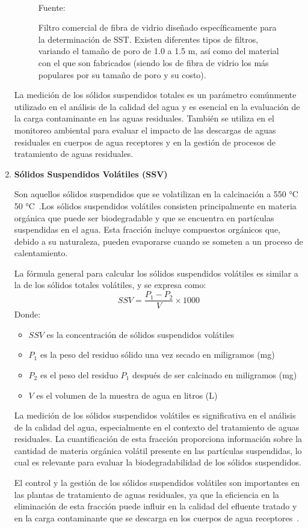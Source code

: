 \begin{enumerate}[label=\textbf{$\bullet$}]
\begin{figure}[H]
		\\\small{Fuente: \cite{Lobov}}
		\caption{Filtro comercial de fibra de vidrio diseñado específicamente para la determinación de SST. Existen diferentes tipos de filtros, variando el tamaño de poro de 1.0 a 1.5 m, así como del material con el que son fabricados (siendo los de fibra de vidrio los más populares por su tamaño de poro y su costo).}\label{fig:filtro}
	\end{figure}
	La medición de los sólidos suspendidos totales es un parámetro comúnmente utilizado en el análisis de la calidad del agua y es esencial en la evaluación de la carga contaminante en las aguas residuales. También se utiliza en el monitoreo ambiental para evaluar el impacto de las descargas de aguas residuales en cuerpos de agua receptores y en la gestión de procesos de tratamiento de aguas residuales.\par
	\item \textbf{Sólidos Suspendidos Volátiles (SSV)} \par                
	Son aquellos sólidos suspendidos que se volatilizan en la calcinación a 550 °C  50 °C~\citep{Economia2015}.Los sólidos suspendidos volátiles consisten principalmente en materia orgánica que puede ser biodegradable y que se encuentra en partículas suspendidas en el agua. Esta fracción incluye compuestos orgánicos que, debido a su naturaleza, pueden evaporarse cuando se someten a un proceso de calentamiento.\par
	La fórmula general para calcular los sólidos suspendidos volátiles es similar a la de los sólidos totales volátiles, y se expresa como:
	\begin{equation*}
		SSV = \frac{P_{1}-P_{2}}{V} \times 1000
	\end{equation*}
	Donde:
	\begin{itemize}
		\item $SSV$ es la concentración de sólidos suspendidos volátiles
		\item $P_{1}$ es la peso del residuo sólido una vez secado en miligramos (mg)
		\item $P_{2}$ es el peso del residuo $P_{1}$ después de ser calcinado en miligramos (mg)
		\item $V$ es el volumen de la muestra de agua en litros (L)
	\end{itemize}
	La medición de los sólidos suspendidos volátiles es significativa en el análisis de la calidad del agua, especialmente en el contexto del tratamiento de aguas residuales. La cuantificación de esta fracción proporciona información sobre la cantidad de materia orgánica volátil presente en las partículas suspendidas, lo cual es relevante para evaluar la biodegradabilidad de los sólidos suspendidos.\par
	El control y la gestión de los sólidos suspendidos volátiles son importantes en las plantas de tratamiento de aguas residuales, ya que la eficiencia en la eliminación de esta fracción puede influir en la calidad del efluente tratado y en la carga contaminante que se descarga en los cuerpos de agua receptores~\citep{martinez1999}.\par
\end{enumerate}
